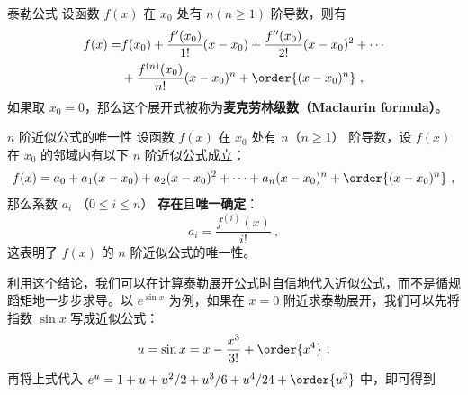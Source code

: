 
\begin{issues}
\issueDraft
\end{issues}



\begin{theorem}{泰勒公式}\label{the_Tayl_1}
设函数 $f(x)$ 在 $x_0$ 处有 $n(n\ge 1)$ 阶导数，则有
\begin{equation}\label{eq_Tayl_2}
\begin{aligned}
f(x)=&f(x_0)+\frac{f'(x_0)}{1!}(x-x_0)+\frac{f''(x_0)}{2!}(x-x_0)^2+\cdots\\
&+\frac{f^{(n)}(x_0)}{n!}(x-x_0)^n+\order{(x-x_0)^n}~,
\end{aligned}
\end{equation}
如果取 $x_0=0$，那么这个展开式被称为\textbf{麦克劳林级数（Maclaurin formula）}。

\end{theorem}
\begin{theorem}{$n$ 阶近似公式的唯一性}\label{the_Tayl_2}
设函数 $f(x)$ 在 $x_0$ 处有 $n$（$n\ge 1$） 阶导数，设 $f(x)$ 在 $x_0$ 的邻域内有以下 $n$ 阶近似公式成立：
\begin{equation}
\begin{aligned}
f(x)=a_0+a_1(x-x_0)+a_2(x-x_0)^2+\cdots+a_n(x-x_0)^n+\order{(x-x_0)^n}~,
\end{aligned}
\end{equation}
那么系数 $a_i$ （$0\le i\le n$） \textbf{存在}且\textbf{唯一确定}：
\begin{equation}
a_i=\frac{f^{(i)}(x)}{i!}~,
\end{equation}
这表明了 $f(x)$ 的 $n$ 阶近似公式的唯一性。
\end{theorem}
利用这个结论，我们可以在计算泰勒展开公式时自信地代入近似公式，而不是循规蹈矩地一步步求导。以 $e^{\sin x}$ 为例，如果在 $x=0$ 附近求泰勒展开，我们可以先将指数 $\sin x$ 写成近似公式：
\begin{equation}
u=\sin x=x-\frac{x^3}{3!}+\order{x^4}~.
\end{equation}
再将上式代入 $e^u=1+u+u^2/2+u^3/6+u^4/24+\order{u^3}$ 中，即可得到
